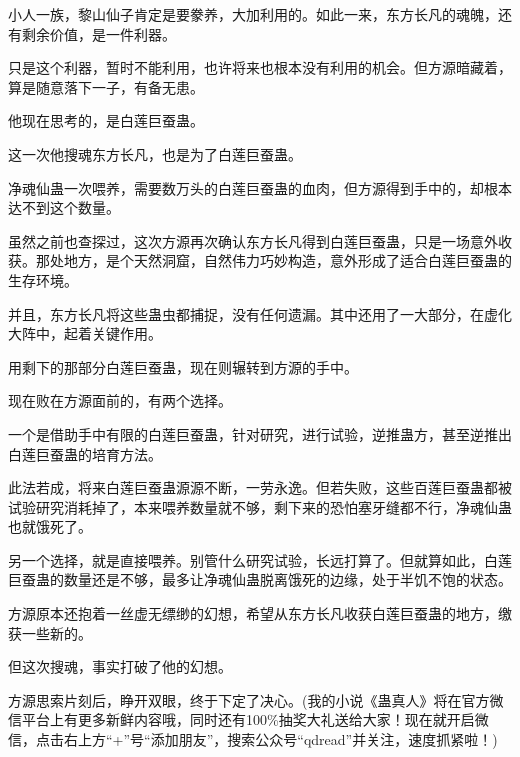 \begin{this_body}
小人一族，黎山仙子肯定是要豢养，大加利用的。如此一来，东方长凡的魂魄，还有剩余价值，是一件利器。

只是这个利器，暂时不能利用，也许将来也根本没有利用的机会。但方源暗藏着，算是随意落下一子，有备无患。

他现在思考的，是白莲巨蚕蛊。

这一次他搜魂东方长凡，也是为了白莲巨蚕蛊。

净魂仙蛊一次喂养，需要数万头的白莲巨蚕蛊的血肉，但方源得到手中的，却根本达不到这个数量。

虽然之前也查探过，这次方源再次确认东方长凡得到白莲巨蚕蛊，只是一场意外收获。那处地方，是个天然洞窟，自然伟力巧妙构造，意外形成了适合白莲巨蚕蛊的生存环境。

并且，东方长凡将这些蛊虫都捕捉，没有任何遗漏。其中还用了一大部分，在虚化大阵中，起着关键作用。

用剩下的那部分白莲巨蚕蛊，现在则辗转到方源的手中。

现在败在方源面前的，有两个选择。

一个是借助手中有限的白莲巨蚕蛊，针对研究，进行试验，逆推蛊方，甚至逆推出白莲巨蚕蛊的培育方法。

此法若成，将来白莲巨蚕蛊源源不断，一劳永逸。但若失败，这些百莲巨蚕蛊都被试验研究消耗掉了，本来喂养数量就不够，剩下来的恐怕塞牙缝都不行，净魂仙蛊也就饿死了。

另一个选择，就是直接喂养。别管什么研究试验，长远打算了。但就算如此，白莲巨蚕蛊的数量还是不够，最多让净魂仙蛊脱离饿死的边缘，处于半饥不饱的状态。

方源原本还抱着一丝虚无缥缈的幻想，希望从东方长凡收获白莲巨蚕蛊的地方，缴获一些新的。

但这次搜魂，事实打破了他的幻想。

方源思索片刻后，睁开双眼，终于下定了决心。(我的小说《蛊真人》将在官方微信平台上有更多新鲜内容哦，同时还有100\%抽奖大礼送给大家！现在就开启微信，点击右上方“+”号“添加朋友”，搜索公众号“qdread”并关注，速度抓紧啦！)

\end{this_body}

